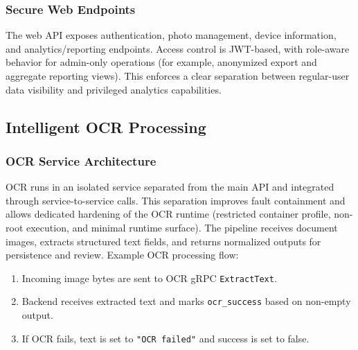 \documentclass[12pt,a4paper]{article}
\begin{document}
    \subsubsection{Secure Web Endpoints}
    The web API exposes authentication, photo management, device information,
    and analytics/reporting endpoints. Access control is JWT-based, with
    role-aware behavior for admin-only operations (for example, anonymized
    export and aggregate reporting views). This enforces a clear separation
    between regular-user data visibility and privileged analytics capabilities.


\subsection{Intelligent OCR Processing}
    \subsubsection{OCR Service Architecture}
    OCR runs in an isolated service separated from the main API and integrated
    through service-to-service calls. This separation improves fault containment
    and allows dedicated hardening of the OCR runtime (restricted container
    profile, non-root execution, and minimal runtime surface). The pipeline
    receives document images, extracts structured text fields, and returns
    normalized outputs for persistence and review.
    Example OCR processing flow:
    \begin{enumerate}[leftmargin=*]
        \item Incoming image bytes are sent to OCR gRPC
        \texttt{ExtractText}.
        \item Backend receives extracted text and marks
        \texttt{ocr\_success} based on non-empty output.
        \item If OCR fails, text is set to \texttt{"OCR failed"} and
        success is set to false.
    \end{enumerate}
\end{document}
